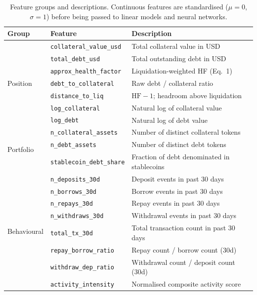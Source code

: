 \documentclass[12pt,a4paper]{article}
\newcommand{\HF}{\mathrm{HF}}
\begin{document}
\begin{table}[htbp]
\centering
\caption{Feature groups and descriptions. Continuous features are standardised
($\mu{=}0$, $\sigma{=}1$) before being passed to linear models and neural networks.}
\label{tab:features}
\renewcommand{\arraystretch}{1.22}
\begin{tabularx}{\textwidth}{llX}
\toprule
\textbf{Group} & \textbf{Feature} & \textbf{Description} \\
\midrule
\multirow{7}{*}{Position}
  & \texttt{collateral\_value\_usd} & Total collateral value in USD \\
  & \texttt{total\_debt\_usd}       & Total outstanding debt in USD \\
  & \texttt{approx\_health\_factor} & Liquidation-weighted HF (Eq.\ 1) \\
  & \texttt{debt\_to\_collateral}   & Raw debt / collateral ratio \\
  & \texttt{distance\_to\_liq}      & $\HF - 1$; headroom above liquidation \\
  & \texttt{log\_collateral}        & Natural log of collateral value \\
  & \texttt{log\_debt}              & Natural log of debt value \\
\midrule
\multirow{3}{*}{Portfolio}
  & \texttt{n\_collateral\_assets}  & Number of distinct collateral tokens \\
  & \texttt{n\_debt\_assets}        & Number of distinct debt tokens \\
  & \texttt{stablecoin\_debt\_share}& Fraction of debt denominated in stablecoins \\
\midrule
\multirow{8}{*}{Behavioural}
  & \texttt{n\_deposits\_30d}       & Deposit events in past 30 days \\
  & \texttt{n\_borrows\_30d}        & Borrow events in past 30 days \\
  & \texttt{n\_repays\_30d}         & Repay events in past 30 days \\
  & \texttt{n\_withdraws\_30d}      & Withdrawal events in past 30 days \\
  & \texttt{total\_tx\_30d}         & Total transaction count in past 30 days \\
  & \texttt{repay\_borrow\_ratio}   & Repay count / borrow count (30d) \\
  & \texttt{withdraw\_dep\_ratio}   & Withdrawal count / deposit count (30d) \\
  & \texttt{activity\_intensity}    & Normalised composite activity score \\

\end{tabularx}
\end{table}
\end{document}
